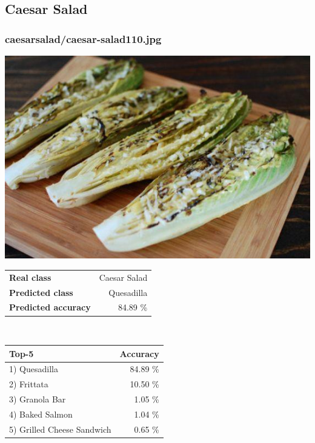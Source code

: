 \subsection{Caesar Salad}
    
\subsubsection{caesar\textunderscore salad/caesar-salad110.jpg}

\begin{minipage}[t]{0.4\textwidth}
	\vspace{0pt}
	\includegraphics[width=\linewidth]{images/evaluation-images/caesar_salad/caesar-salad110.jpg}
\end{minipage}
\hfill
\begin{minipage}[t]{0.5\textwidth}
	\vspace{0pt}\raggedright
	\begin{tabularx}{\textwidth}{X r}
		\small \textbf{Real class} & \small Caesar Salad\\
		\small \textbf{Predicted class} & \small Quesadilla\\
		\small \textbf{Predicted accuracy} & \small 84.89 \%
    \end{tabularx}\\
    
    \vspace{6pt}
	\begin{tabularx}{\textwidth}{X r}
        \small \textbf{Top-5} & \small \textbf{Accuracy} \\
        \hline
		\small 1) Quesadilla & \small 84.89 \%\\\small 2) Frittata & \small 10.50 \%\\\small 3) Granola Bar & \small 1.05 \%\\\small 4) Baked Salmon & \small 1.04 \%\\\small 5) Grilled Cheese Sandwich & \small 0.65 \%
    \end{tabularx}
\end{minipage}
    
